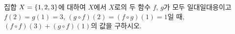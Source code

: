 집합 $X=\{1{,}\mkern3mu\mathopen{}2{,}\mkern3mu\mathopen{}3\}$에 대하여 $X$에서 $X$로의 두 함수 $f$, $g$가 모두 일대일대응이고 $f(2)=g(1)=3$, $(g\circ f)(2)=(f\circ g)(1)=1$일 때, $(f\circ f)(3)+(g\circ f)(1)$의 값을 구하시오.
